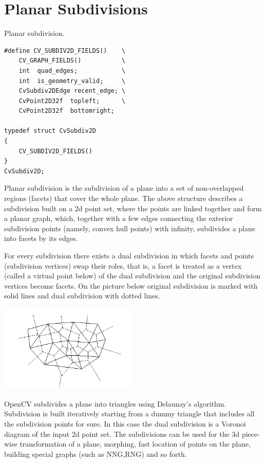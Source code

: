\section{Planar Subdivisions}

\ifCPy

\label{CvSubdiv2D}

Planar subdivision.

\begin{lstlisting}
#define CV_SUBDIV2D_FIELDS()    \
    CV_GRAPH_FIELDS()           \
    int  quad_edges;            \
    int  is_geometry_valid;     \
    CvSubdiv2DEdge recent_edge; \
    CvPoint2D32f  topleft;      \
    CvPoint2D32f  bottomright;

typedef struct CvSubdiv2D
{
    CV_SUBDIV2D_FIELDS()
}
CvSubdiv2D;
\end{lstlisting}

Planar subdivision is the subdivision of a plane into a set of
non-overlapped regions (facets) that cover the whole plane. The above
structure describes a subdivision built on a 2d point set, where the points
are linked together and form a planar graph, which, together with a few
edges connecting the exterior subdivision points (namely, convex hull points)
with infinity, subdivides a plane into facets by its edges.

For every subdivision there exists a dual subdivision in which facets and
points (subdivision vertices) swap their roles, that is, a facet is
treated as a vertex (called a virtual point below) of the dual subdivision and
the original subdivision vertices become facets. On the picture below
original subdivision is marked with solid lines and dual subdivision
with dotted lines.

\includegraphics[width=0.5\textwidth]{pics/subdiv.png}

OpenCV subdivides a plane into triangles using Delaunay's
algorithm. Subdivision is built iteratively starting from a dummy
triangle that includes all the subdivision points for sure. In this
case the dual subdivision is a Voronoi diagram of the input 2d point set. The
subdivisions can be used for the 3d piece-wise transformation of a plane,
morphing, fast location of points on the plane, building special graphs
(such as NNG,RNG) and so forth.

